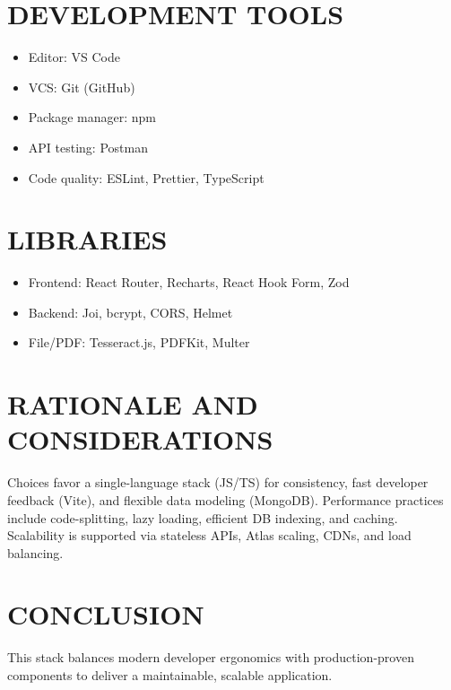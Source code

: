 \section{DEVELOPMENT TOOLS}

\begin{itemize}
\item Editor: VS Code
\item VCS: Git (GitHub)
\item Package manager: npm
\item API testing: Postman
\item Code quality: ESLint, Prettier, TypeScript
\end{itemize}

\section{LIBRARIES}

\begin{itemize}
\item Frontend: React Router, Recharts, React Hook Form, Zod
\item Backend: Joi, bcrypt, CORS, Helmet
\item File/PDF: Tesseract.js, PDFKit, Multer
\end{itemize}

\section{RATIONALE AND CONSIDERATIONS}

Choices favor a single-language stack (JS/TS) for consistency, fast developer feedback (Vite), and flexible data modeling (MongoDB). Performance practices include code-splitting, lazy loading, efficient DB indexing, and caching. Scalability is supported via stateless APIs, Atlas scaling, CDNs, and load balancing.

\section{CONCLUSION}

This stack balances modern developer ergonomics with production-proven components to deliver a maintainable, scalable application.